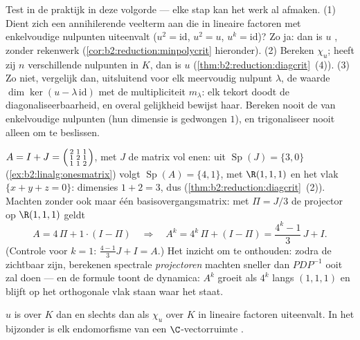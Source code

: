 \begin{method}\label{met:b2:reduction:decide}
Test in de praktijk in deze volgorde --- elke stap kan het werk al
afmaken. (1) Dient zich een annihilerende veelterm aan die in
lineaire factoren met enkelvoudige nulpunten uiteenvalt ($u^2 =
\mathrm{id}$, $u^2 = u$, $u^k = \mathrm{id}$)? Zo ja: dan is $u$
, zonder rekenwerk
(\cref{cor:b2:reduction:minpolycrit} hieronder). (2) Bereken
$\chi_u$; heeft zij $n$ verschillende nulpunten in $K$, dan is $u$
 (\cref{thm:b2:reduction:diagcrit}~(4)). (3) Zo
niet, vergelijk dan, uitsluitend voor elk meervoudig nulpunt
$\lambda$, de waarde $\dim\ker(u - \lambda\,\mathrm{id})$ met de
multipliciteit $m_\lambda$: elk tekort doodt de
diagonaliseerbaarheid, en overal gelijkheid bewijst haar. Bereken
nooit de  van enkelvoudige nulpunten (hun dimensie is
gedwongen $1$), en trigonaliseer nooit alleen om te beslissen.
\end{method}

\begin{example}\label{ex:b2:reduction:diagwork}
$A = I + J = \begin{psmallmatrix}2 & 1 & 1\\ 1 & 2 & 1\\ 1 & 1 &
2\end{psmallmatrix}$, met $J$ de matrix vol enen: uit
$\operatorname{Sp}(J) = \{3, 0\}$
(\cref{ex:b2:linalg:onesmatrix}) volgt $\operatorname{Sp}(A) = \{4,
1\}$, met  $\R(1,1,1)$ en het vlak $\{x + y + z = 0\}$:
dimensies $1 + 2 = 3$, dus 
(\cref{thm:b2:reduction:diagcrit}~(2)). Machten zonder ook maar
één basisovergangsmatrix: met $\Pi = J/3$ de projector op
$\R(1,1,1)$ geldt
\[
A = 4\,\Pi + 1\cdot(I - \Pi)
\quad\Longrightarrow\quad
A^k = 4^k\,\Pi + (I - \Pi)
= \frac{4^k - 1}{3}\,J + I .
\]
(Controle voor $k = 1$: $\frac{4-1}3 J + I = A$.) Het inzicht om te
onthouden: zodra de  zichtbaar zijn, berekenen
spectrale \emph{projectoren} machten sneller dan $PDP^{-1}$ ooit
zal doen --- en de formule toont de dynamica: $A^k$ groeit als
$4^k$ langs $(1,1,1)$ en blijft op het orthogonale vlak staan waar
het staat.
\end{example}

\begin{theorem}[Trigonalisatie]\label{thm:b2:reduction:trigonalization}
$u$ is  over $K$ dan en slechts dan als $\chi_u$
over $K$ in lineaire factoren uiteenvalt. In het bijzonder is elk
endomorfisme van een $\C$-vectorruimte
.
\end{theorem}

